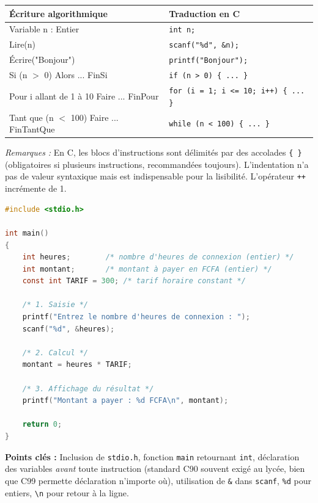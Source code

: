 \documentclass[11pt]{article}
\begin{document}
\begin{corrige}
\begin{center}
\begin{tabularx}{\linewidth}{|l|X|}
\hline
\rowcolor{popblueL} \textbf{Écriture algorithmique} & \textbf{Traduction en C} \\
\hline
Variable n : Entier & \texttt{int n;} \\
\hline
Lire(n) & \texttt{scanf("\%d", \&n);} \\
\hline
Écrire("Bonjour") & \texttt{printf("Bonjour");} \\
\hline
Si (n $>$ 0) Alors ... FinSi & \texttt{if (n > 0) \{ ... \}} \\
\hline
Pour i allant de 1 à 10 Faire ... FinPour & \texttt{for (i = 1; i <= 10; i++) \{ ... \}} \\
\hline
Tant que (n $<$ 100) Faire ... FinTantQue & \texttt{while (n < 100) \{ ... \}} \\
\hline
\end{tabularx}
\end{center}
\emph{Remarques :} En C, les blocs d'instructions sont délimités par des accolades \texttt{\{ \}} (obligatoires si plusieurs instructions, recommandées toujours). L'indentation n'a pas de valeur syntaxique mais est indispensable pour la lisibilité. L'opérateur \texttt{++} incrémente de 1.
\end{corrige}

\begin{corrige}
\begin{lstlisting}[language=C]
#include <stdio.h>

int main()
{
    int heures;        /* nombre d'heures de connexion (entier) */
    int montant;       /* montant à payer en FCFA (entier) */
    const int TARIF = 300; /* tarif horaire constant */

    /* 1. Saisie */
    printf("Entrez le nombre d'heures de connexion : ");
    scanf("%d", &heures);

    /* 2. Calcul */
    montant = heures * TARIF;

    /* 3. Affichage du résultat */
    printf("Montant a payer : %d FCFA\n", montant);

    return 0;
}
\end{lstlisting}
\textbf{Points clés :} Inclusion de \texttt{stdio.h}, fonction \texttt{main} retournant \texttt{int}, déclaration des variables \emph{avant} toute instruction (standard C90 souvent exigé au lycée, bien que C99 permette déclaration n'importe où), utilisation de \texttt{\&} dans \texttt{scanf}, \texttt{\%d} pour entiers, \texttt{\textbackslash n} pour retour à la ligne.
\end{corrige}
\end{document}
